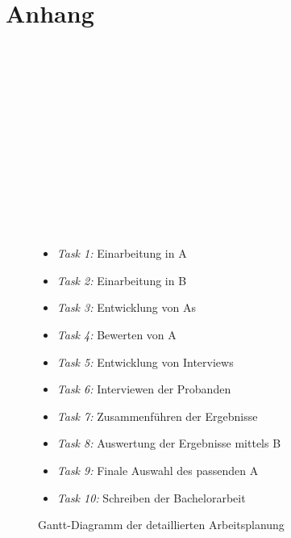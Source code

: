 \section{Anhang}\label{sec:anhang}
\begin{figure}[!ht]
    \begin{ganttchart}{1}{15}
         \\
         \\
         \\
         \\
         \\
         \\
         \\
         \\
         \\
         \\
         \\
         \\
        \label{fig:gantchart}
    \end{ganttchart}
    \caption{Gantt-Diagramm der detaillierten Arbeitsplanung}
    \begin{itemize}
        \item \textit{Task 1:} Einarbeitung in A
        \item \textit{Task 2:} Einarbeitung in B
        \item \textit{Task 3:} Entwicklung von As
        \item \textit{Task 4:} Bewerten von A
        \item \textit{Task 5:} Entwicklung von Interviews
        \item \textit{Task 6:} Interviewen der Probanden
        \item \textit{Task 7:} Zusammenführen der Ergebnisse
        \item \textit{Task 8:} Auswertung der Ergebnisse mittels B
        \item \textit{Task 9:} Finale Auswahl des passenden A
        \item \textit{Task 10:} Schreiben der Bachelorarbeit
    \end{itemize}
\end{figure}
